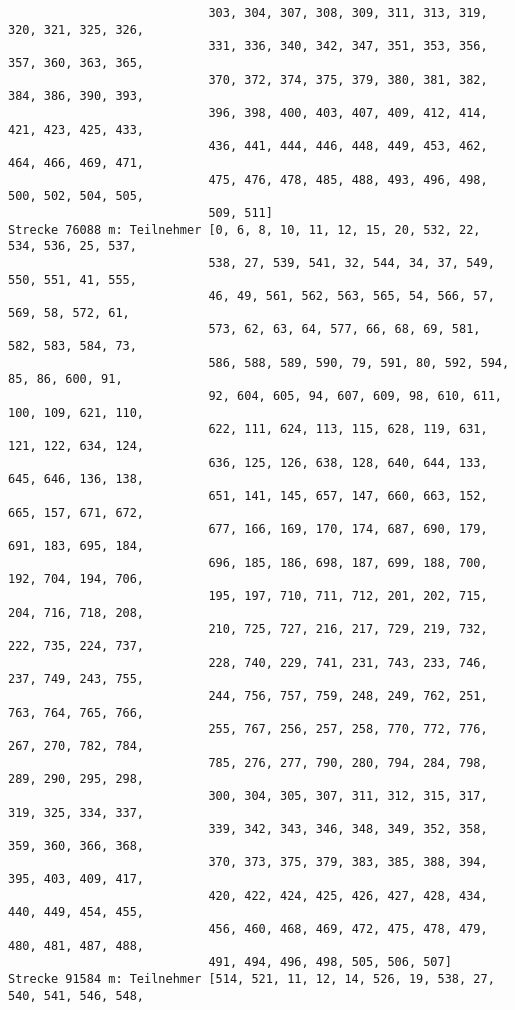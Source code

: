 \documentclass[a4paper,10pt,ngerman]{scrartcl}
\begin{document}
\begin{itemize}
\begin{verbatim}
                            303, 304, 307, 308, 309, 311, 313, 319, 320, 321, 325, 326, 
                            331, 336, 340, 342, 347, 351, 353, 356, 357, 360, 363, 365, 
                            370, 372, 374, 375, 379, 380, 381, 382, 384, 386, 390, 393, 
                            396, 398, 400, 403, 407, 409, 412, 414, 421, 423, 425, 433, 
                            436, 441, 444, 446, 448, 449, 453, 462, 464, 466, 469, 471, 
                            475, 476, 478, 485, 488, 493, 496, 498, 500, 502, 504, 505, 
                            509, 511]
Strecke 76088 m: Teilnehmer [0, 6, 8, 10, 11, 12, 15, 20, 532, 22, 534, 536, 25, 537, 
                            538, 27, 539, 541, 32, 544, 34, 37, 549, 550, 551, 41, 555, 
                            46, 49, 561, 562, 563, 565, 54, 566, 57, 569, 58, 572, 61, 
                            573, 62, 63, 64, 577, 66, 68, 69, 581, 582, 583, 584, 73, 
                            586, 588, 589, 590, 79, 591, 80, 592, 594, 85, 86, 600, 91, 
                            92, 604, 605, 94, 607, 609, 98, 610, 611, 100, 109, 621, 110, 
                            622, 111, 624, 113, 115, 628, 119, 631, 121, 122, 634, 124, 
                            636, 125, 126, 638, 128, 640, 644, 133, 645, 646, 136, 138, 
                            651, 141, 145, 657, 147, 660, 663, 152, 665, 157, 671, 672, 
                            677, 166, 169, 170, 174, 687, 690, 179, 691, 183, 695, 184, 
                            696, 185, 186, 698, 187, 699, 188, 700, 192, 704, 194, 706, 
                            195, 197, 710, 711, 712, 201, 202, 715, 204, 716, 718, 208, 
                            210, 725, 727, 216, 217, 729, 219, 732, 222, 735, 224, 737, 
                            228, 740, 229, 741, 231, 743, 233, 746, 237, 749, 243, 755, 
                            244, 756, 757, 759, 248, 249, 762, 251, 763, 764, 765, 766, 
                            255, 767, 256, 257, 258, 770, 772, 776, 267, 270, 782, 784, 
                            785, 276, 277, 790, 280, 794, 284, 798, 289, 290, 295, 298, 
                            300, 304, 305, 307, 311, 312, 315, 317, 319, 325, 334, 337, 
                            339, 342, 343, 346, 348, 349, 352, 358, 359, 360, 366, 368, 
                            370, 373, 375, 379, 383, 385, 388, 394, 395, 403, 409, 417, 
                            420, 422, 424, 425, 426, 427, 428, 434, 440, 449, 454, 455, 
                            456, 460, 468, 469, 472, 475, 478, 479, 480, 481, 487, 488, 
                            491, 494, 496, 498, 505, 506, 507]
Strecke 91584 m: Teilnehmer [514, 521, 11, 12, 14, 526, 19, 538, 27, 540, 541, 546, 548, 

\end{verbatim}
\end{itemize}
\end{document}
